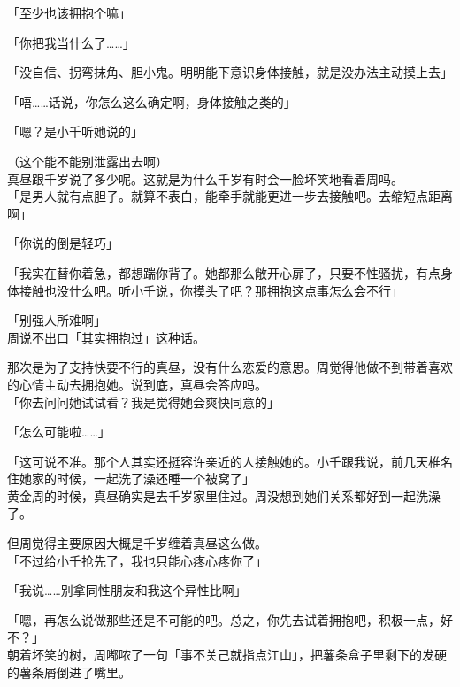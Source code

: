 「至少也该拥抱个嘛」

「你把我当什么了……」

「没自信、拐弯抹角、胆小鬼。明明能下意识身体接触，就是没办法主动摸上去」

「唔……话说，你怎么这么确定啊，身体接触之类的」

「嗯？是小千听她说的」

（这个能不能别泄露出去啊）\\

真昼跟千岁说了多少呢。这就是为什么千岁有时会一脸坏笑地看着周吗。\\

「是男人就有点胆子。就算不表白，能牵手就能更进一步去接触吧。去缩短点距离啊」

「你说的倒是轻巧」

「我实在替你着急，都想踹你背了。她都那么敞开心扉了，只要不性骚扰，有点身体接触也没什么吧。听小千说，你摸头了吧？那拥抱这点事怎么会不行」

「别强人所难啊」\\

周说不出口「其实拥抱过」这种话。

那次是为了支持快要不行的真昼，没有什么恋爱的意思。周觉得他做不到带着喜欢的心情主动去拥抱她。说到底，真昼会答应吗。\\

「你去问问她试试看？我是觉得她会爽快同意的」

「怎么可能啦……」

「这可说不准。那个人其实还挺容许亲近的人接触她的。小千跟我说，前几天椎名住她家的时候，一起洗了澡还睡一个被窝了」\\

黄金周的时候，真昼确实是去千岁家里住过。周没想到她们关系都好到一起洗澡了。

但周觉得主要原因大概是千岁缠着真昼这么做。\\

「不过给小千抢先了，我也只能心疼心疼你了」

「我说……别拿同性朋友和我这个异性比啊」

「嗯，再怎么说做那些还是不可能的吧。总之，你先去试着拥抱吧，积极一点，好不？」\\

朝着坏笑的树，周嘟哝了一句「事不关己就指点江山」，把薯条盒子里剩下的发硬的薯条屑倒进了嘴里。
